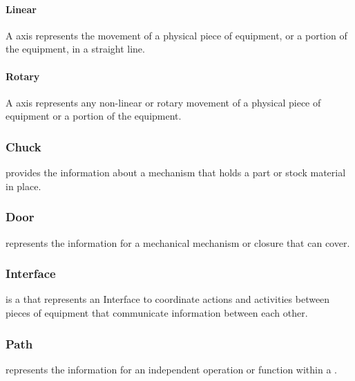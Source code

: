 \paragraph{Linear}\mbox{}
\label{sec:Linear}


A  axis represents the movement of a physical piece of equipment, or a portion of the equipment, in a straight line. 


\paragraph{Rotary}\mbox{}
\label{sec:Rotary}


A  axis represents any non-linear or rotary movement of a physical piece of equipment or a portion of the equipment.


\subsubsection{Chuck}
\label{sec:Chuck}



 provides the information about a mechanism that holds a part or stock material in place.


\subsubsection{Door}
\label{sec:Door}



 represents the information for a mechanical mechanism or closure that can cover.


\subsubsection{Interface}
\label{sec:Interface}



 is a  that represents an \gls{Interface} to coordinate actions and activities between pieces of equipment that communicate information between each other.


\subsubsection{Path}
\label{sec:Path}



 represents the information for an independent operation or function within a .



